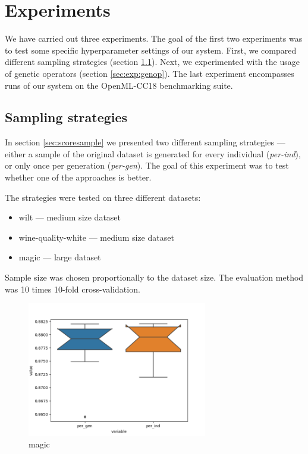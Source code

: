 \chapter{Experiments} \label{experiments}
We have carried out three experiments. The goal of the first two experiments was
to test some specific hyperparameter settings of our system. First, we compared
different sampling strategies (section \ref{sec:exp:sample}). Next, we
experimented with the usage of genetic operators (section \ref{sec:exp:genop}).
The last experiment encompasses runs of our system on the OpenML-CC18 benchmarking
suite.

\section{Sampling strategies} \label{sec:exp:sample}
In section \ref{sec:scoresample} we presented two different sampling strategies
--- either a sample of the original dataset is generated for every individual
(\emph{per-ind}),
or only once per generation (\emph{per-gen}). The goal of this experiment was to test whether one
of the approaches is better.

The strategies were tested on three different datasets:
\begin{itemize}
\item wilt --- medium size dataset %
\item wine-quality-white --- medium size dataset %
\item magic --- large dataset %
\end{itemize}

Sample size was chosen proportionally to the dataset size. The evaluation method
was 10 times 10-fold cross-validation.

\begin{figure}[ht]\centering
\includegraphics[width=0.7\textwidth]{../img/magic-out.png}
\caption{magic}
\label{pic04:magic}
\end{figure}

